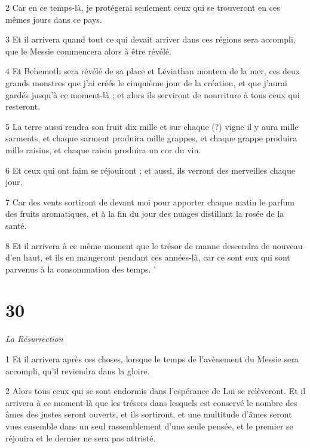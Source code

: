 \par 2 Car en ce temps-là, je protégerai seulement ceux qui se trouveront en ces mêmes jours dans ce pays.

\par 3 Et il arrivera quand tout ce qui devait arriver dans ces régions sera accompli, que le Messie commencera alors à être révélé.

\par 4 Et Behemoth sera révélé de sa place et Léviathan montera de la mer, ces deux grands monstres que j'ai créés le cinquième jour de la création, et que j'aurai gardés jusqu'à ce moment-là ; et alors ils serviront de nourriture à tous ceux qui resteront.

\par 5 La terre aussi rendra son fruit dix mille et sur chaque (?) vigne il y aura mille sarments, et chaque sarment produira mille grappes, et chaque grappe produira mille raisins, et chaque raisin produira un cor du vin.

\par 6 Et ceux qui ont faim se réjouiront ; et aussi, ils verront des merveilles chaque jour.

\par 7 Car des vents sortiront de devant moi pour apporter chaque matin le parfum des fruits aromatiques, et à la fin du jour des nuages ​​distillant la rosée de la santé.

\par 8 Et il arrivera à ce même moment que le trésor de manne descendra de nouveau d'en haut, et ils en mangeront pendant ces années-là, car ce sont eux qui sont parvenus à la consommation des temps. '

\chapter{30}

\par \textit{La Résurrection}

\par 1 Et il arrivera après ces choses, lorsque le temps de l'avènement du Messie sera accompli, qu'il reviendra dans la gloire.

\par 2 Alors tous ceux qui se sont endormis dans l'espérance de Lui se relèveront. Et il arrivera à ce moment-là que les trésors dans lesquels est conservé le nombre des âmes des justes seront ouverts, et ils sortiront, et une multitude d'âmes seront vues ensemble dans un seul rassemblement d'une seule pensée, et le premier se réjouira et le dernier ne sera pas attristé.

